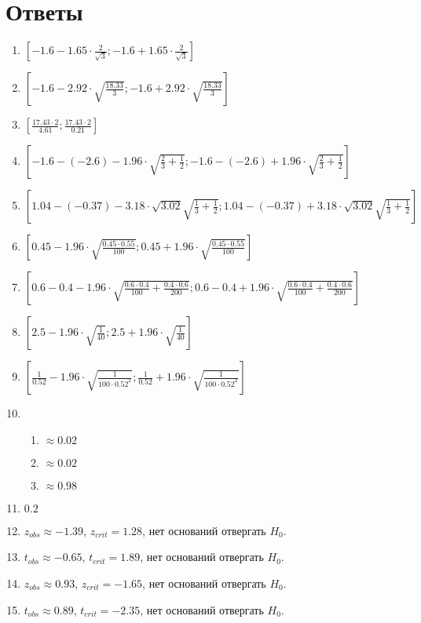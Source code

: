 \documentclass[12pt]{article}
\begin{document}
\section{Ответы}


\begin{enumerate}
\item $\left[-1.6 - 1.65 \cdot \frac{2}{\sqrt{3}}; -1.6 + 1.65 \cdot \frac{2}{\sqrt{3}} \right]$
\item $\left[-1.6 - 2.92 \cdot \sqrt{\frac{18.33}{3}}; -1.6 + 2.92 \cdot \sqrt{\frac{18.33}{3}} \right]$
\item $\left[\frac{17.43 \cdot 2}{4.61}; \frac{17.43 \cdot 2}{0.21} \right]$
\item $\left[-1.6 - (-2.6) - 1.96 \cdot \sqrt{\frac{2}{3} + \frac{1}{2}}; -1.6 - (-2.6) + 1.96 \cdot \sqrt{\frac{2}{3} + \frac{1}{2}} \right]$
\item $\left[1.04 - (-0.37) - 3.18 \cdot \sqrt{3.02} \sqrt{\frac{1}{3} + \frac{1}{2}}; 1.04 - (-0.37) + 3.18 \cdot \sqrt{3.02} \sqrt{\frac{1}{3} + \frac{1}{2}} \right]$
\item $\left[0.45 - 1.96 \cdot \sqrt{\frac{0.45 \cdot 0.55}{100}}; 0.45 + 1.96 \cdot \sqrt{\frac{0.45 \cdot 0.55}{100}} \right]$
\item $\left[0.6 - 0.4 - 1.96  \cdot \sqrt{\frac{0.6\cdot0.4}{100} + \frac{0.4 \cdot 0.6}{200}}; 0.6 - 0.4 + 1.96 \cdot \sqrt{\frac{0.6\cdot0.4}{100} + \frac{0.4 \cdot 0.6}{200}} \right]$
\item $\left[2.5 - 1.96 \cdot \sqrt{\frac{1}{40}}; 2.5 + 1.96 \cdot \sqrt{\frac{1}{40}} \right]$
\item $\left[\frac{1}{0.52} - 1.96 \cdot \sqrt{\frac{1}{100 \cdot 0.52^2}}; \frac{1}{0.52} + 1.96 \cdot \sqrt{\frac{1}{100 \cdot 0.52^2}} \right]$
\item
\begin{enumerate}
\item $\approx 0.02$
\item $\approx 0.02$
\item $\approx 0.98$
\end{enumerate}
\item $0.2$
\item $z_{obs} \approx -1.39 $, $z_{crit} = 1.28$, нет оснований отвергать $H_0$.
\item $t_{obs} \approx -0.65$, $t_{crit} = 1.89$, нет оснований отвергать $H_0$.
\item $z_{obs} \approx 0.93$, $z_{crit} = -1.65$, нет оснований отвергать $H_0$.
\item $t_{obs} \approx 0.89$, $t_{crit} = -2.35$, нет оснований отвергать $H_0$.

\end{enumerate}
\end{document}
